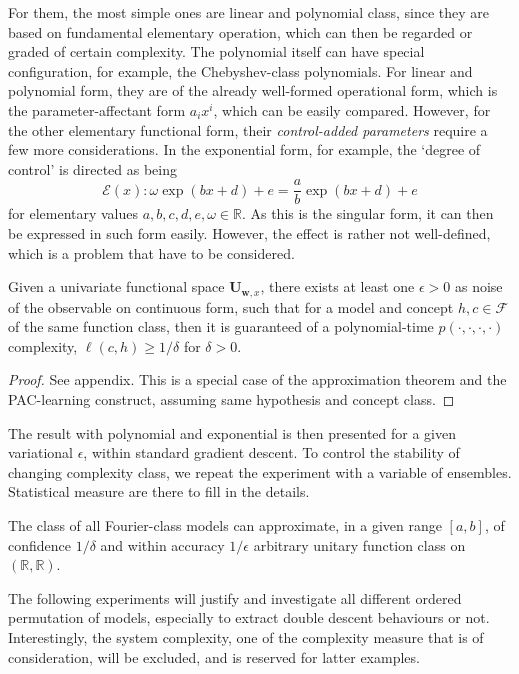 \documentclass[twoside,10pt]{article}
\begin{document}
For them, the most simple ones are linear and polynomial class, since they are based on fundamental elementary operation, which can then be regarded or graded of certain complexity. The polynomial itself can have special configuration, for example, the Chebyshev-class polynomials. For linear and polynomial form, they are of the already well-formed operational form, which is the parameter-affectant form $a_{i}x^{i}$, which can be easily compared. However, for the other elementary functional form, their \textit{control-added parameters} require a few more considerations. In the exponential form, for example, the `degree of control' is directed as being 
\begin{equation}
  \mathcal{E}(x) : \omega \exp{(bx+d)}+ e = \frac{a}{b} \exp{(bx + d)} + e 
\end{equation}
for elementary values $a,b,c,d,e,\omega \in \mathbb{R}$. As this is the singular form, it can then be expressed in such form easily. However, the effect is rather not well-defined, which is a problem that have to be considered. 

\begin{theorem}
  Given a univariate functional space $\mathbf{U}_{\mathbf{w},x}$, there exists at least one $\epsilon > 0$ as noise of the observable on continuous form, such that for a model and concept $h,c\in \mathcal{F}$ of the same function class, then it is guaranteed of a polynomial-time $p(\cdot,\cdot,\cdot,\cdot)$ complexity, $\ell(c,h)\geq 1/\delta$ for $\delta > 0$. 
\end{theorem}
\begin{proof}
  See appendix. This is a special case of the approximation theorem and the PAC-learning construct, assuming same hypothesis and concept class. 
\end{proof}
The result with polynomial and exponential is then presented for a given variational $\epsilon$, within standard gradient descent. To control the stability of changing complexity class, we repeat the experiment with a variable of ensembles. Statistical measure are there to fill in the details. 

\begin{theorem}
  The class of all Fourier-class models can approximate, in a given range $[a,b]$, of confidence $1/\delta$ and within accuracy $1/\epsilon$ arbitrary unitary function class on $(\mathbb{R},\mathbb{R})$. 
\end{theorem}


The following experiments will justify and investigate all different ordered permutation of models, especially to extract double descent behaviours or not. Interestingly, the system complexity, one of the complexity measure that is of consideration, will be excluded, and is reserved for latter examples. 
\end{document}
